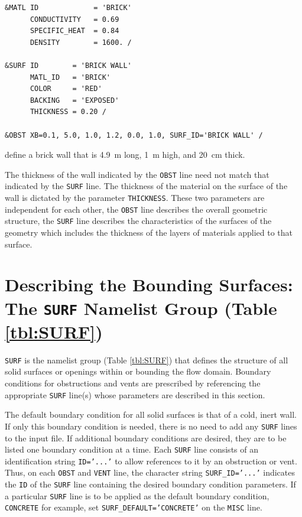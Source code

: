 \documentclass[11pt]{book}
\newcommand{\ct}{\tt\small}
\begin{document}
\footnotesize
\begin{verbatim}
&MATL ID             = 'BRICK'
      CONDUCTIVITY   = 0.69
      SPECIFIC_HEAT  = 0.84
      DENSITY        = 1600. /

&SURF ID        = 'BRICK WALL'
      MATL_ID   = 'BRICK'
      COLOR     = 'RED'
      BACKING   = 'EXPOSED'
      THICKNESS = 0.20 /

&OBST XB=0.1, 5.0, 1.0, 1.2, 0.0, 1.0, SURF_ID='BRICK WALL' /
\end{verbatim}
\normalsize

\noindent
define a brick wall that is 4.9~m long, 1~m high, and 20~cm thick.
\begin{warning}
\noindent
The thickness of the wall indicated by the {\ct OBST} line need not
match that indicated by the {\ct SURF} line. The thickness of the material on the surface of the wall
is dictated by the parameter {\ct THICKNESS}.  These two parameters are independent for each other,
the {\ct OBST} line describes the overall geometric structure, the {\ct SURF} line describes the
characteristics of the surfaces of the geometry which includes the thickness of the layers of
materials applied to that surface.
\end{warning}

\section{Describing the Bounding Surfaces: The \texorpdfstring{{\tt SURF}}{SURF} Namelist Group (Table \ref{tbl:SURF})}
\label{info:SURF}

{\ct SURF} is the namelist group (Table \ref{tbl:SURF}) that defines
the structure of all solid surfaces or openings within or
bounding the flow domain. Boundary conditions for obstructions and vents are 
prescribed by referencing the appropriate {\ct SURF} line(s) whose
parameters are described in this section.

The default boundary condition for all solid surfaces is that of a
cold, inert wall. If only this
boundary condition is needed, there is no need to add any {\ct SURF} lines
to the input file. If additional boundary conditions are desired,
they are to be listed one boundary condition at a time.
Each {\ct SURF} line consists of an identification string {\ct ID='...'} to
allow references to it by an obstruction or vent. Thus, on each
{\ct OBST} and {\ct VENT} line, the character string {\ct SURF\_ID='...'}
indicates the {\ct ID} of the {\ct SURF} line containing the desired boundary
condition parameters. If a particular {\ct SURF} line is to be applied
as the default boundary condition, {\ct CONCRETE} for example,
set {\ct SURF\_DEFAULT='CONCRETE'} on the {\ct MISC} line.
\end{document}

